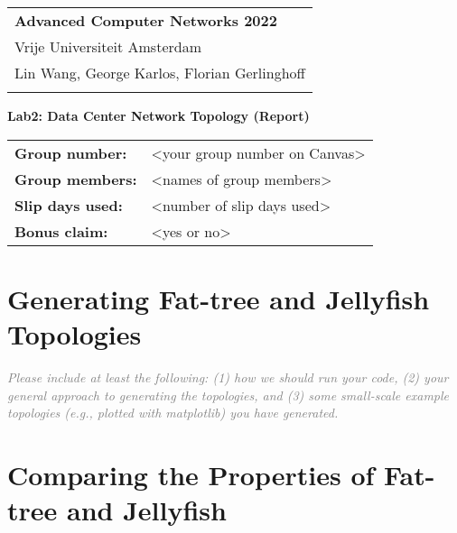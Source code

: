 \documentclass[a4paper,11pt]{article}
\newcommand{\note}[1]{\textit{\textcolor{gray}{#1}}}
\begin{document}
\thispagestyle{empty} 

\begin{tabular}{@{}p{15.5cm}} 
{\bf Advanced Computer Networks 2022} \\
Vrije Universiteit Amsterdam  \\ Lin Wang, George Karlos, Florian Gerlinghoff\\
\hline 
\\
\end{tabular} 

\vspace*{0.3cm} 

{\LARGE \bf Lab2: Data Center Network Topology (Report)} 

\vspace*{0.3cm} 


\begin{tcolorbox}[sharp corners, colback=blue!5!white]
\begin{tabular}{@{}ll}
\textbf{Group number:} & <your group number on Canvas> \\
\textbf{Group members:} & <names of group members> \\
\textbf{Slip days used:} & <number of slip days used> \\
\textbf{Bonus claim:} & <yes or no>
\end{tabular}
\end{tcolorbox}

\vspace{0.4cm}


\section{Generating Fat-tree and Jellyfish Topologies}

\note{Please include at least the following: (1) how we should run your code, (2) your general approach to generating the topologies, and (3) some small-scale example topologies (e.g., plotted with matplotlib) you have generated.}

\section{Comparing the Properties of Fat-tree and Jellyfish}
\end{document}
